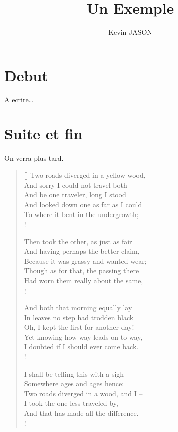 \documentclass[a4paper,11pt]{article}
\author{K\’evin JASON}
\title{Un Exemple}
\begin{document}
\maketitle
\tableofcontents
\section{D\’ebut}
\‘A \’ecrire\dots
\section{Suite et fin}
On verra plus tard.


\settowidth{\versewidth}{Because it was grassy and wanted wear;} %
\begin{verse}[\versewidth]
Two roads diverged in a yellow wood, \\
And sorry I could not travel both \\
And be one traveler, long I stood \\
And looked down one as far as I could \\
To where it bent in the undergrowth; \\!


Then took the other, as just as fair \\
And having perhaps the better claim, \\
Because it was grassy and wanted wear; \\
Though as for that, the passing there \\
Had worn them really about the same, \\!


And both that morning equally lay \\
In leaves no step had trodden black \\
Oh, I kept the first for another day! \\
Yet knowing how way leads on to way, \\
I doubted if I should ever come back. \\!


I shall be telling this with a sigh \\
Somewhere ages and ages hence: \\
Two roads diverged in a wood, and I -- \\
I took the one less traveled by, \\
And that has made all the difference. \\!
\end{verse}
\end{document}
